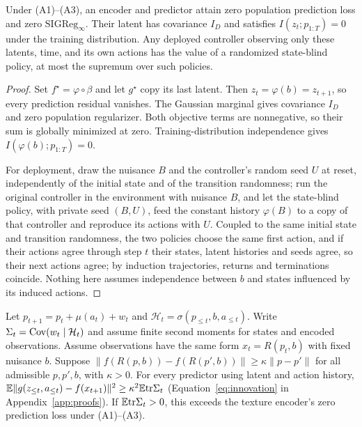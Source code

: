 \begin{proposition}
\label{prop:representation}
Under (A1)--(A3), an encoder and predictor attain zero population prediction loss and zero $\mathrm{SIGReg}_\infty$.
Their latent has covariance $I_D$ and satisfies $I(z_t;p_{1:T})=0$ under the training distribution.
Any deployed controller observing only these latents, time, and its own actions has the value of a randomized state-blind policy, at most the supremum over such policies.
\end{proposition}
\begin{proof}
Set $f^\star=\varphi\circ\beta$ and let $g^\star$ copy its last latent.
Then $z_t=\varphi(b)=z_{t+1}$, so every prediction residual vanishes.
The Gaussian marginal gives covariance $I_D$ and zero population regularizer.
Both objective terms are nonnegative, so their sum is globally minimized at zero.
Training-distribution independence gives $I(\varphi(b);p_{1:T})=0$.

For deployment, draw the nuisance $B$ and the controller's random seed $U$ at reset, independently of
the initial state and of the transition randomness; run the original controller in the environment
with nuisance $B$, and let the state-blind policy, with private seed $(B,U)$, feed the constant history
$\varphi(B)$ to a copy of that controller and reproduce its actions with $U$. Coupled to the same
initial state and transition randomness, the two policies choose the same first action, and if their actions agree through step $t$ their states,
latent histories and seeds agree, so their next actions agree; by induction trajectories, returns and
terminations coincide. Nothing here assumes independence between $b$ and states influenced by its
induced actions.
\end{proof}

\begin{corollary}
\label{cor:strict}
Let $p_{t+1}=p_t+\mu(a_t)+w_t$ and $\mathcal H_t=\sigma(p_{\le t},b,a_{\le t})$.
Write $\Sigma_t=\mathrm{Cov}(w_t\mid\mathcal H_t)$ and assume finite second moments for states and encoded observations.
Assume observations have the same form $x_t=R(p_t,b)$ with fixed nuisance $b$.
Suppose $\|f(R(p,b))-f(R(p',b))\|\ge\kappa\|p-p'\|$ for all admissible $p,p',b$, with $\kappa>0$.
For every predictor using latent and action history,
$\mathbb{E}\|g(z_{\le t},a_{\le t})-f(x_{t+1})\|^2 \ge \kappa^2\mathbb{E}\mathrm{tr}\Sigma_t$ (Equation~\ref{eq:innovation}
in Appendix~\ref{app:proofs}). If $\mathbb{E}\mathrm{tr}\Sigma_t>0$, this exceeds the texture encoder's zero prediction loss under (A1)--(A3).
\end{corollary}

